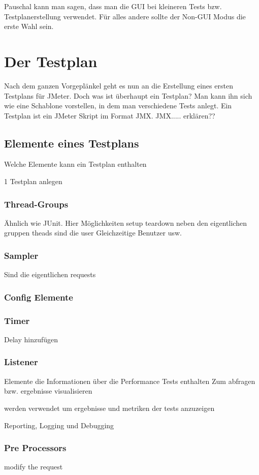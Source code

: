 \documentclass[a4paper,12pt]{article}
\begin{document}
Pauschal kann man sagen, dass man die GUI bei kleineren Tests bzw. Testplanerstellung verwendet. Für alles andere sollte der Non-GUI Modus die erste Wahl sein.

\section{Der Testplan}
Nach dem ganzen Vorgeplänkel geht es nun an die Erstellung eines ersten Testplans für JMeter.
Doch was ist überhaupt ein Testplan? Man kann ihn sich wie eine Schablone vorstellen, in dem man verschiedene Tests anlegt. Ein Testplan ist ein JMeter Skript im Format JMX.
JMX..... erklären??

\subsection{Elemente eines Testplans}
Welche Elemente kann ein Testplan enthalten

1 Testplan anlegen
\subsubsection{Thread-Groups}
Ähnlich wie JUnit. Hier Möglichkeiten setup teardown neben den eigentlichen gruppen
theads sind die user
Gleichzeitige Benutzer usw.
\subsubsection{Sampler}
Sind die eigentlichen requests
\subsubsection{Config Elemente}
\subsubsection{Timer}
Delay hinzufügen
\subsubsection{Listener}
Elemente die Informationen über die Performance Tests enthalten
Zum abfragen bzw. ergebnisse visualisieren

werden verwendet um ergebnisse und metriken der tests anzuzeigen

Reporting, Logging und Debugging

\subsubsection{Pre Processors}
modify the request
\end{document}
